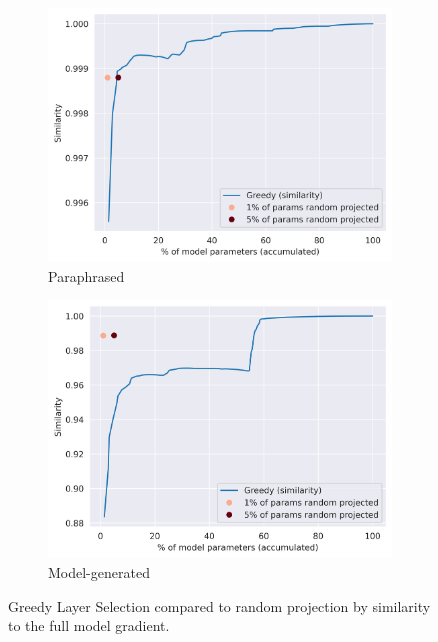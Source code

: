 \begin{figure}[H]
    \centering
    \begin{subfigure}[b]{0.49\textwidth}
        \centering
        \includegraphics[width=\textwidth]{figures/results/paraphrased/greedy_layer_selection.png}
        \caption{Paraphrased}
        \label{fig:greedy_layer_selection_paraphrased}
    \end{subfigure}
    \hfill
    \begin{subfigure}[b]{0.49\textwidth}
        \centering
        \includegraphics[width=\textwidth]{figures/results/model-generated/greedy_layer_selection.png}
        \caption{Model-generated}
        \label{fig:greedy_layer_selection_model_generated}
    \end{subfigure}
    \caption{Greedy Layer Selection compared to random projection by similarity to the full model gradient.}
    \label{fig:greedy_layer_selection}
\end{figure}


